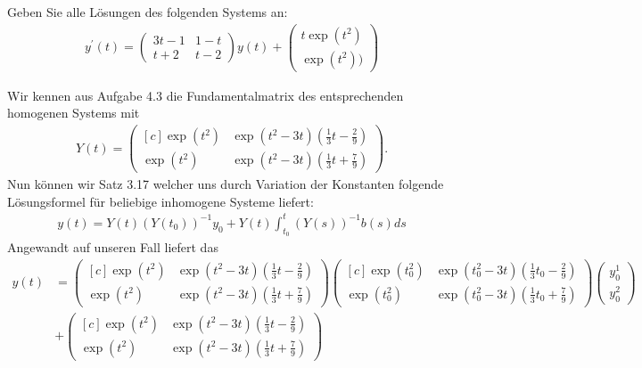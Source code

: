 \begin{exercise}
Geben Sie alle Lösungen des folgenden Systems an:
\begin{align*}
  y^{\prime}(t) = \begin{pmatrix}
    3t -1 & 1 - t \\ t + 2 & t - 2
  \end{pmatrix}
  y(t) +
  \begin{pmatrix}
    t\exp(t^2) \\ \exp(t^2))
  \end{pmatrix}
\end{align*}
\end{exercise}
\begin{solution}
Wir kennen aus Aufgabe 4.3 die Fundamentalmatrix des entsprechenden homogenen Systems mit
\begin{align*}
Y(t) = \begin{pmatrix*}[c]
  \exp(t^2) & \exp(t^2-3t)(\frac{1}{3}t - \frac{2}{9}) \\
  \exp(t^2) & \exp(t^2-3t)(\frac{1}{3}t + \frac{7}{9})
\end{pmatrix*}.
\end{align*}
Nun können wir Satz 3.17 welcher uns durch Variation der Konstanten folgende
Lösungsformel für beliebige inhomogene Systeme liefert:
\begin{align*}
  y(t) = Y(t)(Y(t_0))^{-1}y_0 + Y(t)\int_{t_0}^{t}(Y(s))^{-1}b(s)ds
\end{align*}
Angewandt auf unseren Fall liefert das
\begin{align*}
  y(t) &= \begin{pmatrix*}[c]
    \exp(t^2) & \exp(t^2-3t)(\frac{1}{3}t - \frac{2}{9}) \\
    \exp(t^2) & \exp(t^2-3t)(\frac{1}{3}t + \frac{7}{9})
  \end{pmatrix*}
  \begin{pmatrix*}[c]
    \exp(t_0^2) & \exp(t_0^2-3t)(\frac{1}{3}t_0 - \frac{2}{9}) \\
    \exp(t_0^2) & \exp(t_0^2-3t)(\frac{1}{3}t_0 + \frac{7}{9})
  \end{pmatrix*}
  \begin{pmatrix}
    y_0^1 \\ y_0^2
  \end{pmatrix} \\
  &+
  \begin{pmatrix*}[c]
    \exp(t^2) & \exp(t^2-3t)(\frac{1}{3}t - \frac{2}{9}) \\
    \exp(t^2) & \exp(t^2-3t)(\frac{1}{3}t + \frac{7}{9})

\end{pmatrix*}
\end{align*}
\end{solution}
